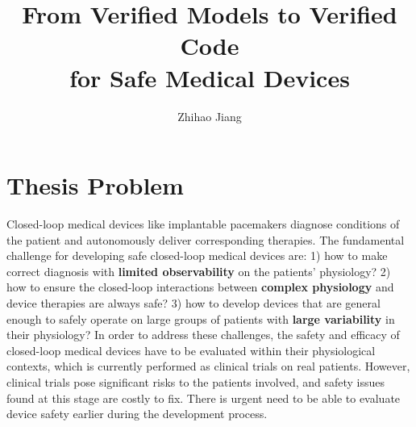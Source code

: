 \documentclass[a4paper]{article}
\title{From Verified Models to Verified Code\\ for Safe Medical Devices}
\author{Zhihao Jiang}
\begin{document}
\maketitle


\section*{Thesis Problem}
Closed-loop medical devices like implantable pacemakers diagnose conditions of the patient and autonomously deliver corresponding therapies.
The fundamental challenge for developing safe closed-loop medical devices are: 
1) how to make correct diagnosis with \textbf{limited observability} on the patients' physiology? 
2) how to ensure the closed-loop interactions between \textbf{complex physiology} and device therapies are always safe?
3) how to develop devices that are general enough to safely operate on large groups of patients with \textbf{large variability} in their physiology?
In order to address these challenges, the safety and efficacy of closed-loop medical devices have to be evaluated within their physiological contexts, which is currently performed as clinical trials on real patients.
However, clinical trials pose significant risks to the patients involved, and safety issues found at this stage are costly to fix. 
There is urgent need to be able to evaluate device safety earlier during the development process.
\end{document}
